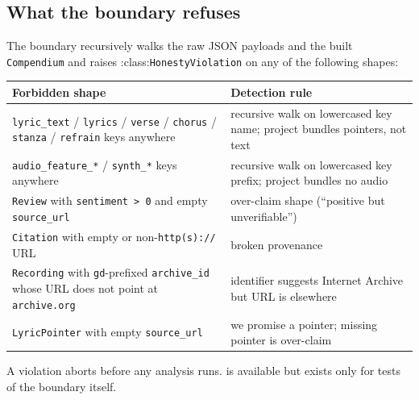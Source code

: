 \documentclass[
]{article}
\newcounter{none} %
\begin{document}
\subsection{What the boundary refuses}\label{what-the-boundary-refuses}

The boundary recursively walks the raw JSON payloads and the built
\texttt{Compendium} and raises :class:\texttt{HonestyViolation} on any
of the following shapes:

{\def\LTcaptype{none} %
\begin{longtable}[]{@{}
  >{\raggedright\arraybackslash}p{}
  >{\raggedright\arraybackslash}p{}@{}}
\toprule\noalign{}
\begin{minipage}[b]{\linewidth}\raggedright
Forbidden shape
\end{minipage} & \begin{minipage}[b]{\linewidth}\raggedright
Detection rule
\end{minipage} \\
\midrule\noalign{}
\endhead
\bottomrule\noalign{}
\endlastfoot
\texttt{lyric\_text} / \texttt{lyrics} / \texttt{verse} /
\texttt{chorus} / \texttt{stanza} / \texttt{refrain} keys anywhere &
recursive walk on lowercased key name; project bundles pointers, not
text \\
\texttt{audio\_feature\_*} / \texttt{synth\_*} keys anywhere & recursive
walk on lowercased key prefix; project bundles no audio \\
\texttt{Review} with \texttt{sentiment\ \textgreater{}\ 0} and empty
\texttt{source\_url} & over-claim shape (``positive but
unverifiable'') \\
\texttt{Citation} with empty or non-\texttt{http(s)://} URL & broken
provenance \\
\texttt{Recording} with \texttt{gd}-prefixed \texttt{archive\_id} whose
URL does not point at \texttt{archive.org} & identifier suggests
Internet Archive but URL is elsewhere \\
\texttt{LyricPointer} with empty \texttt{source\_url} & we promise a
pointer; missing pointer is over-claim \\
\end{longtable}
}

A violation aborts  before any analysis
runs.  is available but exists only for
tests of the boundary itself.
\end{document}

